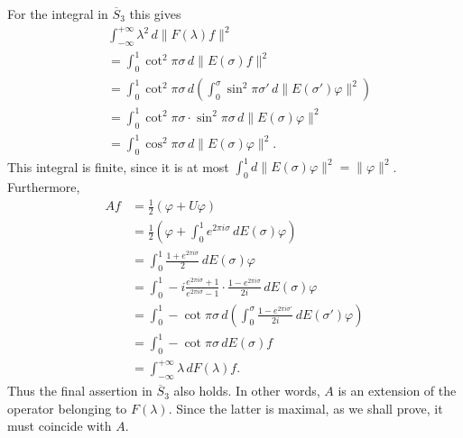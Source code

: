 \documentclass[fontsize=13pt,twoside,openany,headings=normal,parskip=false,bookmarkpackage=false,DIV=calc]{scrbook}
\begin{document}
\hypertarget{origpage-83}{}%
For the integral in $\hyperref[cond:II.Sbar3]{\overline S_3}$ this gives
\begin{align*}
&\int_{-\infty}^{+\infty}\lambda^2\,d\|F(\lambda)f\|^2\\
&=\int_0^1\cot^2\pi\sigma\,d\|E(\sigma)f\|^2\\
&=\int_0^1\cot^2\pi\sigma\,
d\left(\int_0^\sigma\sin^2\pi\sigma'\,d\|E(\sigma')\varphi\|^2\right)\\
&=\int_0^1\cot^2\pi\sigma\cdot\sin^2\pi\sigma\,d\|E(\sigma)\varphi\|^2\\
&=\int_0^1\cos^2\pi\sigma\,d\|E(\sigma)\varphi\|^2.
\end{align*}
This integral is finite, since it is at most $\int_0^1d\|E(\sigma)\varphi\|^2=\|\varphi\|^2$. Furthermore,
\begin{align*}
Af&=\frac12(\varphi+U\varphi)\\
&=\frac12\left(\varphi+\int_0^1e^{2\pi i\sigma}\,dE(\sigma)\varphi\right)\\
&=\int_0^1\frac{1+e^{2\pi i\sigma}}2\,dE(\sigma)\varphi\\
&=\int_0^1-i\frac{e^{2\pi i\sigma}+1}{e^{2\pi i\sigma}-1}\cdot
\frac{1-e^{2\pi i\sigma}}{2i}\,dE(\sigma)\varphi\\
&=\int_0^1-\cot\pi\sigma\,
d\left(\int_0^\sigma\frac{1-e^{2\pi i\sigma'}}{2i}\,dE(\sigma')\varphi\right)\\
&=\int_0^1-\cot\pi\sigma\,dE(\sigma)f\\
&=\int_{-\infty}^{+\infty}\lambda\,dF(\lambda)f.
\end{align*}
Thus the final assertion in $\hyperref[cond:II.Sbar3]{\overline S_3}$ also holds. In other words, $A$ is an extension of the operator belonging to $F(\lambda)$. Since the latter is maximal, as we shall prove, it must coincide with $A$.
\end{document}

